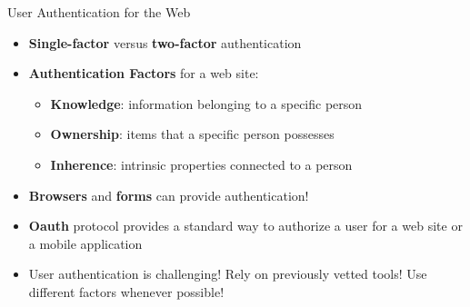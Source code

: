 \documentclass[14pt,aspectratio=169]{beamer}
\begin{document}
%
\begin{frame}{User Authentication for the Web}
  \begin{itemize}
    \item {\bf Single-factor} versus {\bf two-factor} authentication
      \vspace*{-.15in}
    \item {\bf Authentication Factors} for a web site:
      \begin{itemize}
        \item {\bf Knowledge}: information belonging to a specific person
        \item {\bf Ownership}: items that a specific person possesses
        \item {\bf Inherence}: intrinsic properties connected to a
          person
      \end{itemize}
      \vspace*{-.25in}
    \item {\bf Browsers} and {\bf forms} can provide authentication!
      \vspace*{-.25in}
    \item {\bf Oauth} protocol provides a standard way to authorize a user for a
      web site or a mobile application
      \vspace*{-.25in}
    \item User authentication is challenging! Rely on previously vetted tools!
      Use different factors whenever possible!
  \end{itemize}
\end{frame}
\end{document}
